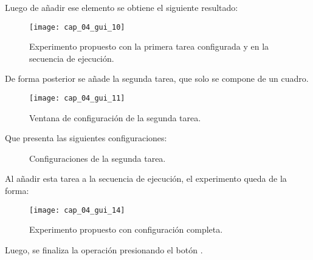 \documentclass[\main/Main.tex]{subfiles}
\begin{document}
                \newpage
                \vspace{-6mm}
                Luego de añadir ese elemento se obtiene el siguiente resultado:
                \begin{figure}[H]
                    \centering
                    \texttt{[image: cap\_04\_gui\_10]}
                    \caption{Experimento propuesto con la primera tarea configurada y en la secuencia de ejecución.}
                    \label{fig:04_gui_exp07}
                \end{figure} 

                \vspace{-6mm}
                De forma posterior se añade la segunda tarea, que solo se compone de un cuadro.
                \begin{figure}[H]
                    \centering
                    \texttt{[image: cap\_04\_gui\_11]}
                    \caption{Ventana de configuración de la segunda tarea.}
                    \label{fig:04_gui_exp08}
                \end{figure} 

                \newpage
                \vspace{-6mm}
                Que presenta las siguientes configuraciones: 
                \begin{figure}[H]
                    \centering
                     \hspace{5mm}
                    \caption{Configuraciones de la segunda tarea.}
                    \label{fig:04_gui_exp09}
                \end{figure} 

                \vspace{-6mm} 
                Al añadir esta tarea a la secuencia de ejecución, el experimento queda de la forma: 
                \begin{figure}[H]
                    \centering
                    \texttt{[image: cap\_04\_gui\_14]}
                    \caption{Experimento propuesto con configuración completa.}
                    \label{fig:04_gui_exp10}
                \end{figure} 

                \newpage
                Luego, se finaliza la operación presionando el botón .
\end{document}
